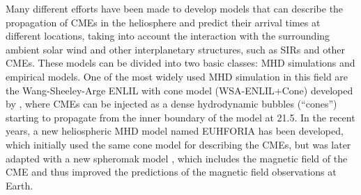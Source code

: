Many different efforts have been made to develop models that can describe the propagation of \acp{CME} in the heliosphere and predict their arrival times at different locations, taking into account the interaction with the surrounding ambient solar wind and other interplanetary structures, such as \acp{SIR} and other \acp{CME}. These models can be divided into two basic classes: \ac{MHD} simulations and empirical models. One of the most widely used \ac{MHD} simulation in this field are the Wang-Sheeley-Arge ENLIL with cone model (WSA-ENLIL+Cone) developed by \citet{Odstrcil-2004}, where CMEs can be injected as a dense hydrodynamic bubbles (``cones'') starting to propagate from the inner boundary of the model at \SI{21.5}{\solarradius}.
In the recent years, a new heliospheric \ac{MHD} model named \acl{EUHFORIA} \citep[\acs{EUHFORIA},][]{Pomoell-2018} has been developed, which initially used the same cone model for describing the \acp{CME}, but was later adapted with a new spheromak model \citep{Scolini-2019}, which includes the magnetic field of the \ac{CME} and thus improved the predictions of the magnetic field observations at Earth.


